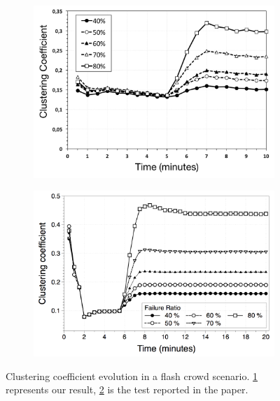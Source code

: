 \begin{figure}
\centering
\begin{subfigure}{.5\textwidth}
  \centering
  \includegraphics[keepaspectratio=true, width=1\linewidth]{images/average_clustering_coefficient_failures}
  \caption{}
  \label{fig:average_clustering_coefficient_failures}
\end{subfigure}%
\begin{subfigure}{.5\textwidth}
  \centering
  \includegraphics[keepaspectratio=true, width=1\linewidth]{images/paper_average_clustering_coefficient_failures}
  \caption{}
  \label{fig:paper_average_clustering_coefficient_failures}
\end{subfigure}
\caption{Clustering coefficient evolution in a flash crowd scenario. \ref{fig:average_clustering_coefficient_failures} represents our result, \ref{fig:paper_average_clustering_coefficient_failures} is the test reported in the paper.}
\label{fig:robustness_clustering_coefficient_failures}
\end{figure}


